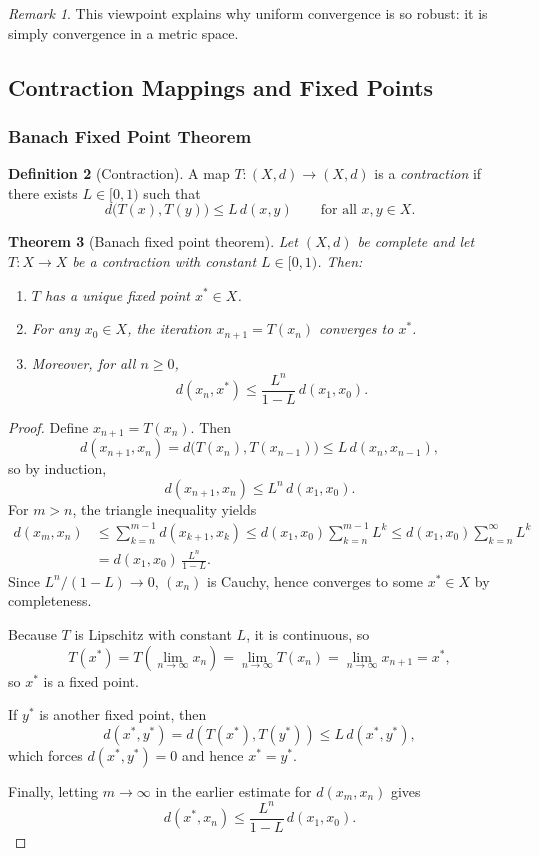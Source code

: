 \documentclass[12pt]{article}
\numberwithin{equation}{section}
\theoremstyle{plain}
\newtheorem{theorem}{Theorem}[section]
\theoremstyle{definition}
\newtheorem{definition}[theorem]{Definition}
\theoremstyle{remark}
\newtheorem{remark}[theorem]{Remark}
\begin{document}
\begin{remark}
This viewpoint explains why uniform convergence is so robust: it is simply convergence in a metric space.
\end{remark}

\subsection{Contraction Mappings and Fixed Points}

\subsubsection{Banach Fixed Point Theorem}

\begin{definition}[Contraction]\label{ms:def:contraction}
A map $T:(X,d)\to(X,d)$ is a \emph{contraction} if there exists $L\in[0,1)$ such that
\[
d\bigl(T(x),T(y)\bigr)\le L\,d(x,y)\qquad\text{for all }x,y\in X.
\]
\end{definition}

\begin{theorem}[Banach fixed point theorem]\label{ms:thm:banach}
Let $(X,d)$ be complete and let $T:X\to X$ be a contraction with constant $L\in[0,1)$.
Then:
\begin{enumerate}[label=(\alph*)]
\item $T$ has a unique fixed point $x^\ast\in X$.
\item For any $x_0\in X$, the iteration $x_{n+1}=T(x_n)$ converges to $x^\ast$.
\item Moreover, for all $n\ge 0$,
\[
d(x_n,x^\ast)\le \frac{L^n}{1-L}\,d(x_1,x_0).
\]
\end{enumerate}
\end{theorem}

\begin{proof}
Define $x_{n+1}=T(x_n)$.
Then
\[
d(x_{n+1},x_n)=d\bigl(T(x_n),T(x_{n-1})\bigr)\le L\,d(x_n,x_{n-1}),
\]
so by induction,
\[
d(x_{n+1},x_n)\le L^n\,d(x_1,x_0).
\]
For $m>n$, the triangle inequality yields
\begin{align*}
d(x_m,x_n)
&\le \sum_{k=n}^{m-1} d(x_{k+1},x_k)
\le d(x_1,x_0)\sum_{k=n}^{m-1} L^k
\le d(x_1,x_0)\sum_{k=n}^{\infty} L^k\\
&= d(x_1,x_0)\,\frac{L^n}{1-L}.
\end{align*}
Since $L^n/(1-L)\to 0$, $(x_n)$ is Cauchy, hence converges to some $x^\ast\in X$ by completeness.

Because $T$ is Lipschitz with constant $L$, it is continuous, so
\[
T(x^\ast)=T\!\left(\lim_{n\to\infty} x_n\right)=\lim_{n\to\infty} T(x_n)=\lim_{n\to\infty} x_{n+1}=x^\ast,
\]
so $x^\ast$ is a fixed point.

If $y^\ast$ is another fixed point, then
\[
d(x^\ast,y^\ast)=d(T(x^\ast),T(y^\ast))\le L\,d(x^\ast,y^\ast),
\]
which forces $d(x^\ast,y^\ast)=0$ and hence $x^\ast=y^\ast$.

Finally, letting $m\to\infty$ in the earlier estimate for $d(x_m,x_n)$ gives
\[
d(x^\ast,x_n)\le \frac{L^n}{1-L}\,d(x_1,x_0).
\]
\end{proof}
\end{document}
